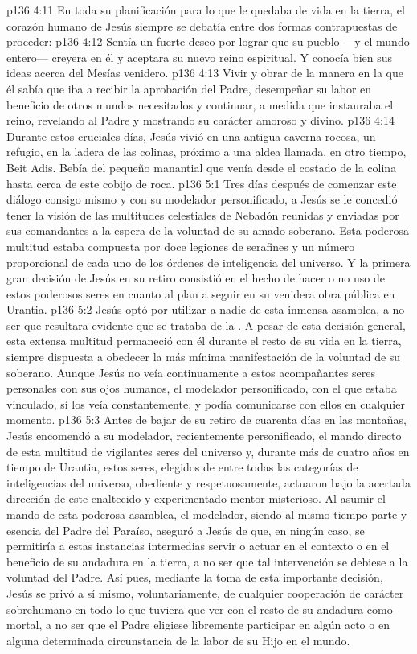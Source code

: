 \vs p136 4:11 \pc En toda su planificación para lo que le quedaba de vida en la tierra, el corazón humano de Jesús siempre se debatía entre dos formas contrapuestas de proceder:
\vs p136 4:12 Sentía un fuerte deseo por lograr que su pueblo ---y el mundo entero--- creyera en él y aceptara su nuevo reino espiritual. Y conocía bien sus ideas acerca del Mesías venidero.
\vs p136 4:13 Vivir y obrar de la manera en la que él sabía que iba a recibir la aprobación del Padre, desempeñar su labor en beneficio de otros mundos necesitados y continuar, a medida que instauraba el reino, revelando al Padre y mostrando su carácter amoroso y divino.
\vs p136 4:14 \pc Durante estos cruciales días, Jesús vivió en una antigua caverna rocosa, un refugio, en la ladera de las colinas, próximo a una aldea llamada, en otro tiempo, Beit Adis. Bebía del pequeño manantial que venía desde el costado de la colina hasta cerca de este cobijo de roca.
\vs p136 5:1 Tres días después de comenzar este diálogo consigo mismo y con su modelador personificado, a Jesús se le concedió tener la visión de las multitudes celestiales de Nebadón reunidas y enviadas por sus comandantes a la espera de la voluntad de su amado soberano. Esta poderosa multitud estaba compuesta por doce legiones de serafines y un número proporcional de cada uno de los órdenes de inteligencia del universo. Y la primera gran decisión de Jesús en su retiro consistió en el hecho de hacer o no uso de estos poderosos seres en cuanto al plan a seguir en su venidera obra pública en Urantia.
\vs p136 5:2 Jesús optó por  utilizar a nadie de esta inmensa asamblea, a no ser que resultara evidente que se trataba de la . A pesar de esta decisión general, esta extensa multitud permaneció con él durante el resto de su vida en la tierra, siempre dispuesta a obedecer la más mínima manifestación de la voluntad de su soberano. Aunque Jesús no veía continuamente a estos acompañantes seres personales con sus ojos humanos, el modelador personificado, con el que estaba vinculado, sí los veía constantemente, y podía comunicarse con ellos en cualquier momento.
\vs p136 5:3 \pc Antes de bajar de su retiro de cuarenta días en las montañas, Jesús encomendó a su modelador, recientemente personificado, el mando directo de esta multitud de vigilantes seres del universo y, durante más de cuatro años en tiempo de Urantia, estos seres, elegidos de entre todas las categorías de inteligencias del universo, obediente y respetuosamente, actuaron bajo la acertada dirección de este enaltecido y experimentado mentor misterioso. Al asumir el mando de esta poderosa asamblea, el modelador, siendo al mismo tiempo parte y esencia del Padre del Paraíso, aseguró a Jesús de que, en ningún caso, se permitiría a estas instancias intermedias servir o actuar en el contexto o en el beneficio de su andadura en la tierra, a no ser que tal intervención se debiese a la voluntad del Padre. Así pues, mediante la toma de esta importante decisión, Jesús se privó a sí mismo, voluntariamente, de cualquier cooperación de carácter sobrehumano en todo lo que tuviera que ver con el resto de su andadura como mortal, a no ser que el Padre eligiese libremente participar en algún acto o en alguna determinada circunstancia de la labor de su Hijo en el mundo.
